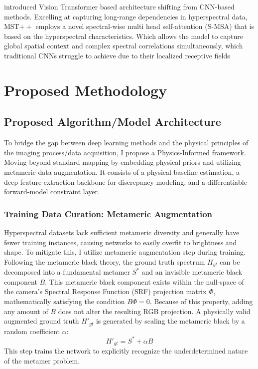\documentclass[stu]{apa7}
\begin{document}
\textcite{cai2022mstmultistagespectralwisetransformer} introduced Vision Transformer based architecture shifting from CNN-based methods. Excelling at capturing long-range dependencies in hyperspectral data, MST$++$ employs a novel spectral-wise multi head self-attention (S-MSA) that is based on the hyperspectral characteristics. Which allows the model to capture global spatial context and complex spectral correlations simultaneously, which traditional CNNs struggle to achieve due to their localized receptive fields
\section{Proposed Methodology}

\subsection{Proposed Algorithm/Model Architecture}

To bridge the gap between deep learning methods and the physical principles of the imaging process/data acquisition, I propose a Physics-Informed framework. Moving beyond standard mapping by embedding physical priors and utilizing metameric data augmentation. It consists of a physical baseline estimation, a deep feature extraction backbone for discrepancy modeling, and a differentiable forward-model constraint layer.

\subsubsection{Training Data Curation: Metameric Augmentation}
Hyperspectral datasets lack sufficient metameric diversity and generally have fewer training instances, causing networks to easily overfit to brightness and shape. To mitigate this, I utilize metameric augmentation \parencite{romero2025uncertaintyquantificationhsireconstruction} step during training. Following the metameric black theory, the ground truth spectrum $H_{gt}$ can be decomposed into a fundamental metamer $S^*$ and an invisible metameric black component $B$. This metameric black component exists within the null-space of the camera's Spectral Response Function (SRF) projection matrix $\Phi$, mathematically satisfying the condition $B \Phi = 0$. Because of this property, adding any amount of $B$ does not alter the resulting RGB projection. A physically valid augmented ground truth $H'_{gt}$ is generated by scaling the metameric black by a random coefficient $\alpha$:
$$H'_{gt} = S^* + \alpha B$$
This step trains the network to explicitly recognize the underdetermined nature of the metamer problem.
\end{document}
